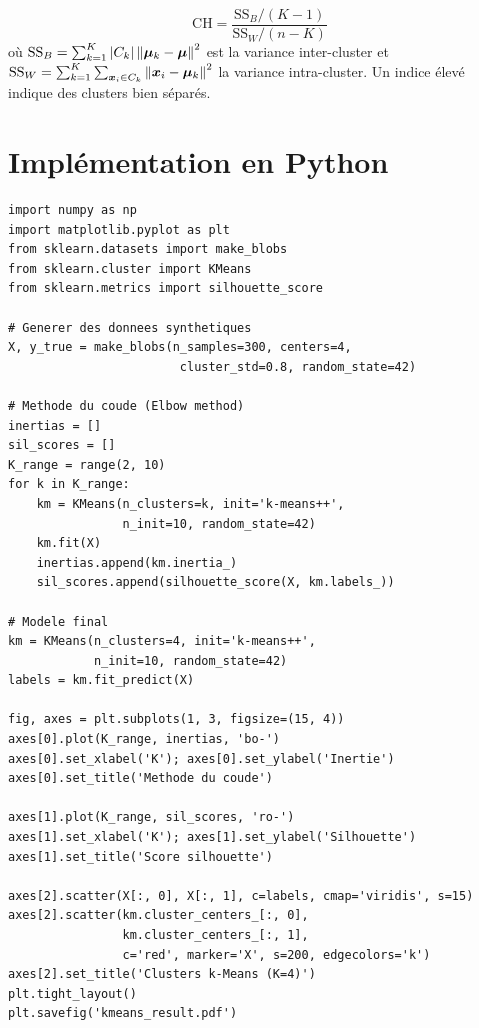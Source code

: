 \begin{definition}
\begin{equation}
  \text{CH} = \frac{\text{SS}_B / (K-1)}{\text{SS}_W / (n-K)}
\end{equation}
o\`u $\text{SS}_B = \sum_{k=1}^K |C_k| \left\| \bm{\mu}_k - \bm{\mu} \right\|^2$ est
la variance inter-cluster et $\text{SS}_W = \sum_{k=1}^K \sum_{\bm{x}_i \in
C_k} \left\| \bm{x}_i - \bm{\mu}_k \right\|^2$ la variance intra-cluster. Un indice
\'elev\'e indique des clusters bien s\'epar\'es.
\end{definition}

\section{Impl\'ementation en Python}
\label{sec:code-clustering}

\begin{codeblock}[title=\textbf{$k$-Means avec scikit-learn}]
\begin{verbatim}
import numpy as np
import matplotlib.pyplot as plt
from sklearn.datasets import make_blobs
from sklearn.cluster import KMeans
from sklearn.metrics import silhouette_score

# Generer des donnees synthetiques
X, y_true = make_blobs(n_samples=300, centers=4,
                        cluster_std=0.8, random_state=42)

# Methode du coude (Elbow method)
inertias = []
sil_scores = []
K_range = range(2, 10)
for k in K_range:
    km = KMeans(n_clusters=k, init='k-means++',
                n_init=10, random_state=42)
    km.fit(X)
    inertias.append(km.inertia_)
    sil_scores.append(silhouette_score(X, km.labels_))

# Modele final
km = KMeans(n_clusters=4, init='k-means++',
            n_init=10, random_state=42)
labels = km.fit_predict(X)

fig, axes = plt.subplots(1, 3, figsize=(15, 4))
axes[0].plot(K_range, inertias, 'bo-')
axes[0].set_xlabel('K'); axes[0].set_ylabel('Inertie')
axes[0].set_title('Methode du coude')

axes[1].plot(K_range, sil_scores, 'ro-')
axes[1].set_xlabel('K'); axes[1].set_ylabel('Silhouette')
axes[1].set_title('Score silhouette')

axes[2].scatter(X[:, 0], X[:, 1], c=labels, cmap='viridis', s=15)
axes[2].scatter(km.cluster_centers_[:, 0],
                km.cluster_centers_[:, 1],
                c='red', marker='X', s=200, edgecolors='k')
axes[2].set_title('Clusters k-Means (K=4)')
plt.tight_layout()
plt.savefig('kmeans_result.pdf')
\end{verbatim}
\end{codeblock}

